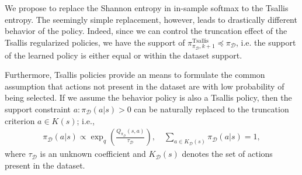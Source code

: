 \documentclass{article}
\newcommand{\AdaBracket}[1]{\left(#1\right)}
\newcommand{\AdaRectBracket}[1]{\left[#1\right]}
\newcommand{\expectation}[2]{\mathbb{E}_{#1}\AdaRectBracket{#2}}
\newcommand{\datasetPolicy}{\pi_{\mathcal{D}}}
\begin{document}
We propose to replace the Shannon entropy in in-sample softmax to the Tsallis entropy.
The seemingly simple replacement, however, leads to drastically different behavior of the policy.
Indeed, since we can control the truncation effect of the Tsallis regularized policies, we have the support of $\pi^{\text{Tsallis}}_{\datasetPolicy, k+1} \preceq \datasetPolicy$, i.e. the support of the learned policy is either equal or within the dataset support.

Furthermore, Tsallis policies provide an means to formulate the common assumption that actions not present in the dataset are with low probability of being selected.
If we assume the behavior policy is also a Tsallis policy, then the support constraint $a:\datasetPolicy(a|s)>0$ can be naturally replaced to the truncation criterion $a\in K(s)$; i.e.,
\begin{align}
    \datasetPolicy(a|s) \propto \exp_q\AdaBracket{\frac{Q_{\datasetPolicy}(s,a)}{\tau_\mathcal{D}}},  \quad \sum_{a\in K_\mathcal{D}(s)} \pi_\mathcal{D}(a|s)= 1,
\end{align}
where $\tau_\mathcal{D}$ is an unknown coefficient and $K_\mathcal{D}(s)$ denotes the set of actions present in the dataset.
\end{document}
